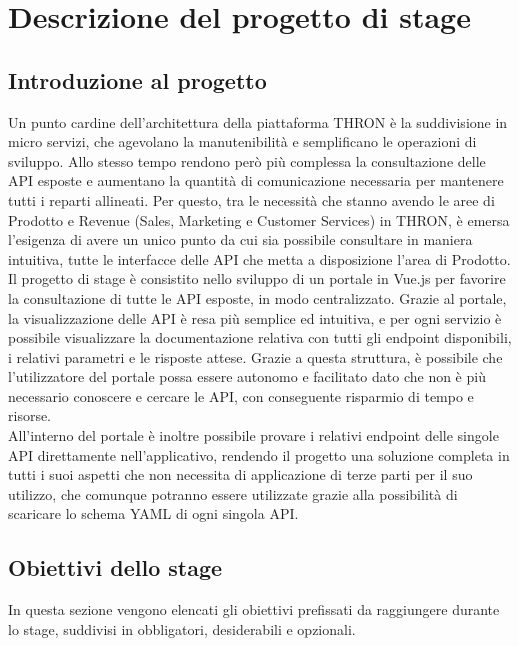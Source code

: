 \chapter{Descrizione del progetto di stage}
\label{cap:descrizione-stage}


\section{Introduzione al progetto}\label{sec:introduzione-progetto}
Un punto cardine dell'architettura della piattaforma THRON è la suddivisione in micro servizi, che agevolano la manutenibilità e semplificano le operazioni di sviluppo.
Allo stesso tempo rendono però più complessa la consultazione delle API esposte e aumentano la quantità di comunicazione necessaria per mantenere tutti i reparti allineati.
Per questo, tra le necessità che stanno avendo le aree di Prodotto e Revenue (Sales, Marketing e Customer Services) in THRON, è emersa l'esigenza di avere un unico punto
da cui sia possibile consultare in maniera intuitiva, tutte le interfacce delle API che metta a disposizione l'area di Prodotto.\\
Il progetto di stage è consistito nello sviluppo di un portale in Vue.js per favorire la consultazione di tutte le API esposte, in modo centralizzato.
Grazie al portale, la visualizzazione delle API è resa più semplice ed intuitiva, e per ogni servizio è possibile visualizzare la documentazione relativa 
con tutti gli endpoint disponibili, i relativi parametri e le risposte attese. Grazie a questa struttura, è possibile che l'utilizzatore del portale possa essere autonomo 
e facilitato dato che non è più necessario conoscere e cercare le API, con conseguente risparmio di tempo e risorse.\\
All'interno del portale è inoltre possibile provare i relativi endpoint delle singole API direttamente nell'applicativo, rendendo il progetto una soluzione completa
in tutti i suoi aspetti che non necessita di applicazione di terze parti per il suo utilizzo, che comunque potranno essere utilizzate grazie alla possibilità di scaricare
lo schema YAML di ogni singola API.


\section{Obiettivi dello stage}\label{sec:obiettivi-stage}
In questa sezione vengono elencati gli obiettivi prefissati da raggiungere durante lo stage, suddivisi in obbligatori, desiderabili e opzionali.

